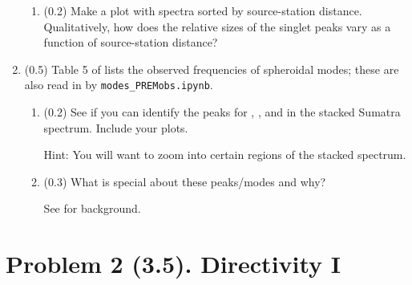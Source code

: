 \documentclass[11pt,titlepage,fleqn]{article}
\begin{document}
\begin{enumerate}
\begin{enumerate}
\item (0.2) Make a plot with   spectra sorted by source-station distance. Qualitatively, how does the relative sizes of the singlet peaks vary as a function of source-station distance?
\end{enumerate}


\item (0.5) Table 5 of \citet{PREM} lists the observed frequencies of spheroidal modes; these are also read in by \verb+modes_PREMobs.ipynb+.
%
\begin{enumerate}
\item (0.2) See if you can identify the peaks for , , and  in the stacked Sumatra spectrum. Include your plots.

Hint: You will want to zoom into certain regions of the stacked spectrum.

\item (0.3) What is special about these peaks/modes and why?

See \citet[][p. 106]{SteinWysession} for background.
\end{enumerate}

\end{enumerate}


\pagebreak
\section*{Problem 2 (3.5). Directivity I}
\end{document}
